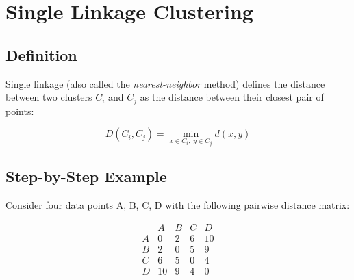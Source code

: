 \documentclass{article}
\begin{document}
\section{Single Linkage Clustering}

\subsection{Definition}

Single linkage (also called the \textit{nearest-neighbor} method) defines the distance between two clusters $C_i$ and $C_j$ as the distance between their closest pair of points:

\[
D(C_i, C_j) = \min_{x \in C_i,\; y \in C_j} d(x, y)
\]

\subsection{Step-by-Step Example}

Consider four data points A, B, C, D with the following pairwise distance matrix:

\[
\begin{array}{c|cccc}
    & A & B & C & D \\
\hline
A & 0 & 2 & 6 & 10 \\
B & 2 & 0 & 5 & 9  \\
C & 6 & 5 & 0 & 4  \\
D & 10 & 9 & 4 & 0  \\
\end{array}
\]
\end{document}
